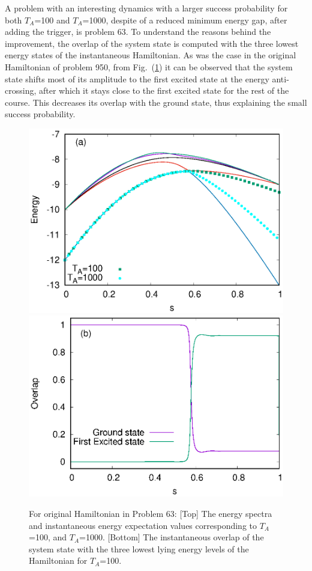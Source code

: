 \documentclass[../main.tex]{subfiles}
\begin{document}
A problem with an interesting dynamics with a larger success probability for both $T_A$=100 and $T_A$=1000, despite of a reduced minimum energy gap, after adding the trigger, is problem 63. To understand the reasons behind the improvement, the overlap of the system state is computed with the three lowest energy states of the instantaneous Hamiltonian. As was the case in the original Hamiltonian of problem 950, from Fig.~(\ref{fig:a52}) it can be observed that the system state shifts most of its amplitude to the first excited state at the energy anti-crossing, after which it stays close to the first excited state for the rest of the course. This decreases its overlap with the ground state, thus explaining the small success probability.
\begin{figure}
\centering
  \includegraphics[scale=0.8 ]{63_O_g2.eps}
  \includegraphics[scale=0.8 ]{63_Orig_Overlap.eps}
  \caption{For original Hamiltonian in Problem 63:  [Top] The energy spectra and instantaneous energy expectation values corresponding to $T_A$=100, and $T_A$=1000. [Bottom] The instantaneous overlap of the system state with the three lowest lying energy levels of the Hamiltonian for $T_A$=100.} 
   \label{fig:a52}
 \end{figure}
\end{document}
